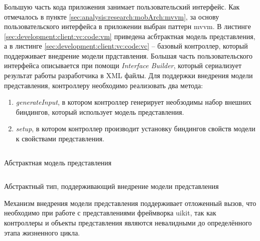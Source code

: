 \subsubsection{}
\label{sec:development:client:vc}

Большую часть кода приложения занимает пользовательский интерфейс. Как отмечалось в пункте \ref{sec:analysis:research:mobArch:mvvm}, за основу пользовательского интерфейса в приложении выбран паттерн \gls{mvvm}. 
В листинге \ref{sec:development:client:vc:code:vm} приведена асбтрактная модель представления, а в листинге \ref{sec:development:client:vc:code:vc} -- базовый контроллер, который поддерживает внедрение модели прдставления. Большая часть пользовательского интерфейса описывается при помощи \textit{Interface Builder}, который сериализует результат работы разработчика в XML файлы. Для поддержки внедрения модели представления, контроллеру необходимо реализовать два метода: 
\begin{enumerate}
	\item \textit{generateInput}, в котором контроллер генерирует необзодимы набор внешних биндингов, который использует модель представления.
	\item \textit{setup}, в котором контроллер производит установку биндингов свойств модели к свойствами представления.
\end{enumerate}

\begin{code}
	\inputminted{swift}{inc/src/vm.swift}
   \caption{Абстрактная модель представления}
   \label{sec:development:client:vc:code:vm}
\end{code}

\begin{code}
	\inputminted{swift}{inc/src/vc.swift}
   \caption{Абстрактный тип, поддерживающий внедрение модели представления}
   \label{sec:development:client:vc:code:vc}
\end{code}

Механизм внедрения модели представления поддерживает отложенный вызов, что необходимо при работе с представлениями фреймворка \gls{uikit}, так как контроллеры и объекты представления являются невалидными до определённого этапа жизненного цикла.